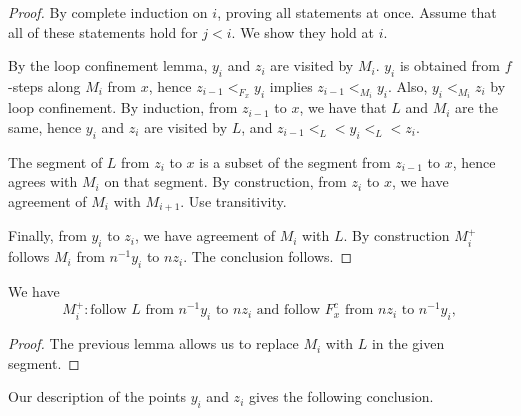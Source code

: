 \begin{proof} By complete induction on $i$, proving all statements
at once.  
Assume that all of these statements hold for $j<i$. We show they
hold at $i$.


By the loop confinement lemma, $y_i$ and $z_i$ are visited by $M_i$.
$y_i$ is obtained from $f$-steps along $M_i$ from $x$, hence
$z_{i-1} <_{F_x} y_i$ implies $z_{i-1} <_{M_i} y_i$.  Also, $y_i <_{M_i} z_i$
by loop confinement.  By induction, from $z_{i-1}$ to $x$, we have that
$L$ and $M_i$ are the same, hence $y_i$ and $z_i$ are visited by $L$, and $z_{i-1} <_L < y_i <_L < z_i$.

The segment of $L$ from $z_i$ to $x$ is a subset of the segment
from $z_{i-1}$ to $x$, hence agrees with $M_i$ on that segment.
By construction, from $z_{i}$ to $x$, we have agreement of $M_i$ with
$M_{i+1}$.  Use transitivity.

Finally, from $y_i$ to $z_i$, we have agreement of $M_i$ with $L$.
By construction $M_i^+$ follows $M_i$ from $n^{-1}y_i$ to $n z_i$.
The conclusion follows.
\end{proof}

\begin{lemma} 
We have
\[
M_i^+: \text{follow } L \text{ from } n^{-1} y_i \text{ to } n z_i
  \text{ and follow } F^c_x \text{ from } nz_i \text{ to } n^{-1} y_i,
\]
\end{lemma} 

\begin{proof} The previous lemma allows us to replace $M_i$
with $L$ in the given  segment.
\end{proof}

Our description of the points $y_i$ and $z_i$ gives the following
conclusion.
